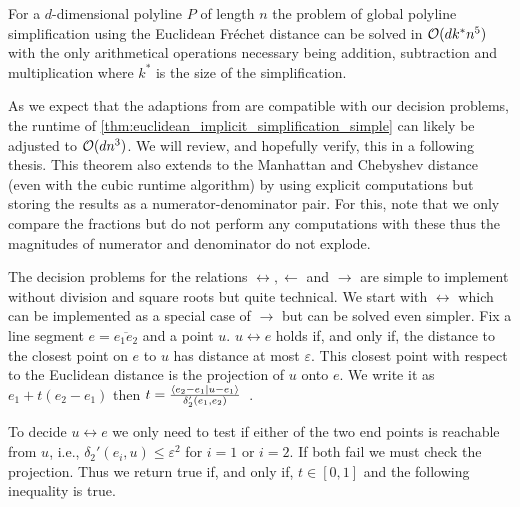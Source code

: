 \begin{theorem}\label{thm:euclidean_implicit_simplification_simple}
  For a \(d\)-dimensional polyline \(P\) of length \(n\) the problem of global polyline simplification using the Euclidean Fréchet distance can be solved in \(\mathcal{O}(d k^*n^5)\) with the only arithmetical operations necessary being addition, subtraction and multiplication where \(k^*\) is the size of the simplification.
\end{theorem}

As we expect that the adaptions from \citeauthor{polyline_simplification_has_cubic_complexity_bringmannetal} are compatible with our decision problems, the runtime of \cref{thm:euclidean_implicit_simplification_simple} can likely be adjusted to \(\mathcal{O}(d n^3)\). We will review, and hopefully verify, this in a following thesis. 
This theorem also extends to the Manhattan and Chebyshev distance (even with the cubic runtime algorithm) by using explicit computations but storing the results as a numerator-denominator pair. For this, note that we only compare the fractions but do not perform any computations with these thus the magnitudes of numerator and denominator do not explode.

The decision problems for the relations \(\leftrightarrow, \leftarrow\) and \(\rightarrow\) are simple to implement without division and square roots but quite technical. We start with \(\leftrightarrow\) which can be implemented as a special case of \(\rightarrow\) but can be solved even simpler. Fix a line segment \(e = \overline{e_1e_2}\) and a point \(u\). \(u \leftrightarrow e\) holds if, and only if, the distance to the closest point on \(e\) to \(u\) has distance at most \(\varepsilon\). This closest point with respect to the Euclidean distance is the projection of \(u\) onto \(e\). We write it as \(e_1 + t(e_2 - e_1)\) then \(t = \frac{\braket{e_2 - e_1 | u - e_1}}{\delta_2'(e_1, e_2)}\)~\cite{linear_algebra}. 

To decide \(u \leftrightarrow e\) we only need to test if either of the two end points is reachable from \(u\), i.e., \(\delta_2'(e_i, u) \leq \varepsilon^2\) for \(i = 1\) or \(i = 2\). If both fail we must check the projection. Thus we return true if, and only if, \(t \in [0, 1]\) and the following inequality is true. 

